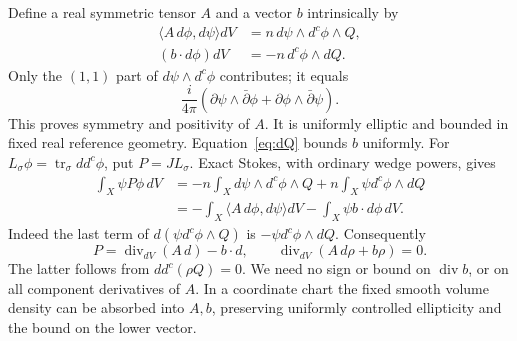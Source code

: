 \documentclass[11pt]{article}
\theoremstyle{remark}\newtheorem{remark}[theorem]{Remark}
\newcommand{\ddc}{dd^c}
\begin{document}
Define a real symmetric tensor $A$ and a vector $b$ intrinsically by
\begin{align*}
 \langle A\,d\phi,d\psi\rangle dV
       &=n\,d\psi\wedge d^c\phi\wedge Q,\\
 (b\cdot d\phi)dV&=-n\,d^c\phi\wedge dQ.
\end{align*}
Only the $(1,1)$ part of $d\psi\wedge d^c\phi$ contributes; it equals
\[
 \frac{i}{4\pi}
  (\partial\psi\wedge\bar\partial\phi
       +\partial\phi\wedge\bar\partial\psi).
\]
This proves symmetry and positivity of $A$.
It is uniformly elliptic and bounded in fixed real reference geometry.
Equation~\eqref{eq:dQ} bounds $b$ uniformly.
For $L_\sigma\phi=\operatorname{tr}_\sigma\ddc\phi$, put $P=JL_\sigma$.
Exact Stokes, with ordinary wedge powers, gives
\begin{align*}
 \int_X\psi P\phi\,dV
 &=-n\int_Xd\psi\wedge d^c\phi\wedge Q
        +n\int_X\psi d^c\phi\wedge dQ\\
 &=-\int_X\langle A\,d\phi,d\psi\rangle dV
        -\int_X\psi b\cdot d\phi\,dV.
\end{align*}
Indeed the last term of $d(\psi d^c\phi\wedge Q)$ is
$-\psi d^c\phi\wedge dQ$.
Consequently
\[
 P=\operatorname{div}_{dV}(A\,d)-b\cdot d,
 \qquad
 \operatorname{div}_{dV}(A\,d\rho+b\rho)=0.
\]
The latter follows from $\ddc(\rho Q)=0$. We need no sign or bound
on $\operatorname{div}b$, or on all component derivatives of $A$.
In a coordinate chart the fixed smooth volume density can be
absorbed into $A,b$, preserving uniformly controlled ellipticity
and the bound on the lower vector.
\end{document}
